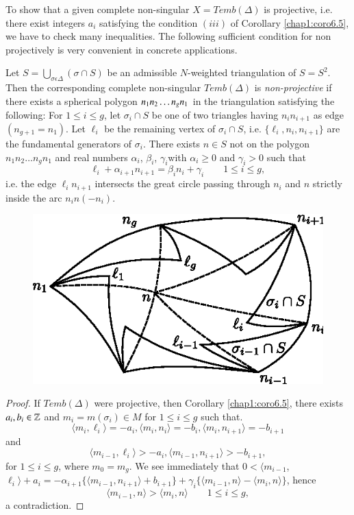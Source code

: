 To show that a given complete non-singular $ X = Temb(\Delta)$ is
projective, i.e. there exist integers $a_i$ satisfying the condition
$(iii)$ of Corollary \ref{chap1:coro6.5}, we have to check many inequalities. The
following sufficient condition for non projectively is very convenient
in concrete applications. 

\setcounter{prop}{2}
\begin{prop}\label{chap1:prop9.3}%
  Let $S=\underset{\sigma \epsilon \Delta}{\bigcup}(\sigma \cap S)$ be
  an admissible $N$-weighted triangulation of $S = S^2$. Then the
  corresponding complete non-singular $Temb(\Delta)$ is
  \textit{non-projective} if there exists a spherical polygon $n_1
  n_2\ldots\break n_g n_1$ in the triangulation satisfying the following:
  For $1 \le i\le g$,  let $\sigma_i\cap S $ be one of two
  triangles having $n_i n_{i+1}$ as edge $(n_{g+1} = n_1)$. Let
  $\ell_i$ be the remaining vertex of $\sigma_i\cap S$,
  i.e. $\{\ell_i, n_i, n_{i+1} \}$ are the fundamental generators of
  $\sigma_i$. There exists $n \in S$ not on the polygon $n_1 n_2\ldots
  n_g n_1$ and real numbers $\alpha_i$, $\beta_i$,
  $\gamma_i$\pageoriginale with $\alpha_i\ge 0$ and $\gamma _i> 0$
  such that  
 $$
 \ell_i + \alpha_{i+1} n_{i+1} = \beta_i n_i + \gamma_i \qquad  1\le  
 i\le g, 
 $$
 i.e. the edge $\ell_i n_{i+1}$ intersects the great circle passing 
 through $n_i$ and $n$ strictly inside the arc $n_in(-n_i)$. 
\begin{figure}[H]
\centering 
\includegraphics{vol58-fig/fig58-25.eps} 
\end{figure}

\end{prop}

\begin{proof}
If $Temb(\Delta)$ were projective, then Corollary \ref{chap1:coro6.5}, there exists
$a_i,\break b_i \in \mathbb{Z}$ and $m_i = m(\sigma_i)\in M$ for $1 \le i \le
g$ such that. 
$$
\langle m_i,\ell_i \rangle = -a_i, \langle m_i, n_i \rangle = -b_i, 
\langle m_i,n_{i+1} \rangle = -b_{i+1} 
$$
and  
$$
\langle m_{i-1}, \ell_i\rangle >  -a_i, \langle m_{i-1}, n_{i+1}\rangle >
-b_{i+1}, 
$$
for $1\le i\le g$, where $m_0 = m_g$. We see immediately that 
$0<\langle m_{i-1}$, $\ell_i \rangle +a_i= -\alpha_{i+1}\{\langle
m_{i-1},n_{i+1}\rangle +b_{i+1} \} + \gamma_i \{\langle
m_{i-1},n\rangle - \langle m_i,n\rangle \}$, hence  
$$
\langle m_{i-1},n\rangle > \langle m_i,n\rangle \qquad 1\le i\le g, 
$$
a contradiction.
\end{proof}

